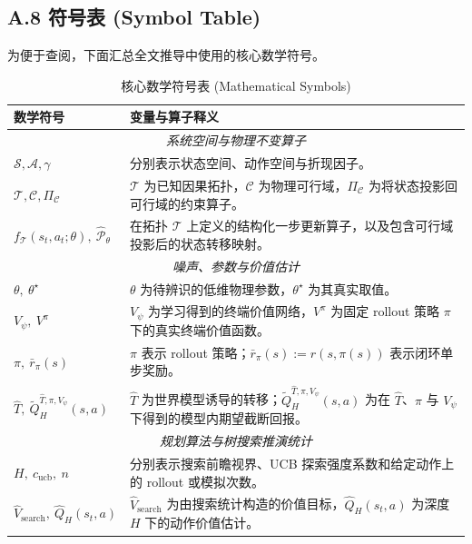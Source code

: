 \documentclass[UTF8]{ctexart}
\begin{document}
\hypertarget{a.8-symbol-table}{%
\subsection{A.8 符号表 (Symbol Table)}\label{a.8-symbol-table}}

为便于查阅，下面汇总全文推导中使用的核心数学符号。

\begin{table}[ht]
\centering
\caption{核心数学符号表 (Mathematical Symbols)}
\renewcommand{\arraystretch}{1.08}
\begin{tabular}{p{} p{}}
\toprule
\textbf{数学符号} & \textbf{变量与算子释义} \\
\midrule
\multicolumn{2}{c}{\textit{系统空间与物理不变算子}} \\
\midrule
$\mathcal{S}, \mathcal{A}, \gamma$ & 分别表示状态空间、动作空间与折现因子。 \\
$\mathcal{T}, \mathcal{C}, \Pi_{\mathcal{C}}$ & \(\mathcal{T}\) 为已知因果拓扑，\(\mathcal{C}\) 为物理可行域，\(\Pi_{\mathcal{C}}\) 为将状态投影回可行域的约束算子。 \\
$f_{\mathcal{T}}(s_t, a_t; \theta),\ \hat{\mathcal P}_\theta$ & 在拓扑 \(\mathcal{T}\) 上定义的结构化一步更新算子，以及包含可行域投影后的状态转移映射。 \\
\midrule
\multicolumn{2}{c}{\textit{噪声、参数与价值估计}} \\
\midrule
$\theta,\ \theta^\star$ & \(\theta\) 为待辨识的低维物理参数，\(\theta^\star\) 为其真实取值。 \\
$V_\psi,\ V^\pi$ & \(V_\psi\) 为学习得到的终端价值网络，\(V^\pi\) 为固定 rollout 策略 \(\pi\) 下的真实终端价值函数。 \\
$\pi,\ \bar r_\pi(s)$ & \(\pi\) 表示 rollout 策略；\(\bar r_\pi(s):=r(s,\pi(s))\) 表示闭环单步奖励。 \\
$\hat T,\ \tilde Q_H^{\hat T,\pi,V_\psi}(s,a)$ & \(\hat T\) 为世界模型诱导的转移；\(\tilde Q_H^{\hat T,\pi,V_\psi}(s,a)\) 为在 \(\hat T\)、\(\pi\) 与 \(V_\psi\) 下得到的模型内期望截断回报。 \\
\midrule
\multicolumn{2}{c}{\textit{规划算法与树搜索推演统计}} \\
\midrule
$H,\ c_{\text{ucb}},\ n$ & 分别表示搜索前瞻视界、UCB 探索强度系数和给定动作上的 rollout 或模拟次数。 \\
$\hat{V}_{\text{search}},\ \hat{Q}_H(s_t,a)$ & \(\hat{V}_{\text{search}}\) 为由搜索统计构造的价值目标，\(\hat{Q}_H(s_t,a)\) 为深度 \(H\) 下的动作价值估计。 \\

\end{tabular}
\end{table}
\end{document}
